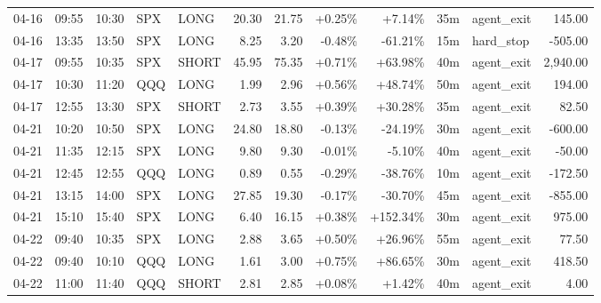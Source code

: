 \documentclass[11pt,a4paper,twoside]{article}
\begin{document}
\begin{center}
\begin{longtable}{>{\color{txtmain}}l l l l l r r r r r >{\color{txtmain}}l r}
04-16 & 09:55 & 10:30 & SPX & LONG & 20.30 & 21.75 & \textcolor{wingreen}{+0.25\%} & \textcolor{wingreen}{+7.14\%} & 35m & agent\_exit & \textcolor{wingreen}{145.00} \\
04-16 & 13:35 & 13:50 & SPX & LONG & 8.25 & 3.20 & \textcolor{lossred}{-0.48\%} & \textcolor{lossred}{-61.21\%} & 15m & hard\_stop & \textcolor{lossred}{-505.00} \\
04-17 & 09:55 & 10:35 & SPX & SHORT & 45.95 & 75.35 & \textcolor{wingreen}{+0.71\%} & \textcolor{wingreen}{+63.98\%} & 40m & agent\_exit & \textcolor{wingreen}{2,940.00} \\
04-17 & 10:30 & 11:20 & QQQ & LONG & 1.99 & 2.96 & \textcolor{wingreen}{+0.56\%} & \textcolor{wingreen}{+48.74\%} & 50m & agent\_exit & \textcolor{wingreen}{194.00} \\
04-17 & 12:55 & 13:30 & SPX & SHORT & 2.73 & 3.55 & \textcolor{wingreen}{+0.39\%} & \textcolor{wingreen}{+30.28\%} & 35m & agent\_exit & \textcolor{wingreen}{82.50} \\
04-21 & 10:20 & 10:50 & SPX & LONG & 24.80 & 18.80 & \textcolor{lossred}{-0.13\%} & \textcolor{lossred}{-24.19\%} & 30m & agent\_exit & \textcolor{lossred}{-600.00} \\
04-21 & 11:35 & 12:15 & SPX & LONG & 9.80 & 9.30 & \textcolor{lossred}{-0.01\%} & \textcolor{lossred}{-5.10\%} & 40m & agent\_exit & \textcolor{lossred}{-50.00} \\
04-21 & 12:45 & 12:55 & QQQ & LONG & 0.89 & 0.55 & \textcolor{lossred}{-0.29\%} & \textcolor{lossred}{-38.76\%} & 10m & agent\_exit & \textcolor{lossred}{-172.50} \\
04-21 & 13:15 & 14:00 & SPX & LONG & 27.85 & 19.30 & \textcolor{lossred}{-0.17\%} & \textcolor{lossred}{-30.70\%} & 45m & agent\_exit & \textcolor{lossred}{-855.00} \\
04-21 & 15:10 & 15:40 & SPX & LONG & 6.40 & 16.15 & \textcolor{wingreen}{+0.38\%} & \textcolor{wingreen}{+152.34\%} & 30m & agent\_exit & \textcolor{wingreen}{975.00} \\
04-22 & 09:40 & 10:35 & SPX & LONG & 2.88 & 3.65 & \textcolor{wingreen}{+0.50\%} & \textcolor{wingreen}{+26.96\%} & 55m & agent\_exit & \textcolor{wingreen}{77.50} \\
04-22 & 09:40 & 10:10 & QQQ & LONG & 1.61 & 3.00 & \textcolor{wingreen}{+0.75\%} & \textcolor{wingreen}{+86.65\%} & 30m & agent\_exit & \textcolor{wingreen}{418.50} \\
04-22 & 11:00 & 11:40 & QQQ & SHORT & 2.81 & 2.85 & \textcolor{wingreen}{+0.08\%} & \textcolor{wingreen}{+1.42\%} & 40m & agent\_exit & \textcolor{wingreen}{4.00} \\

\end{longtable}
\end{center}
\end{document}
